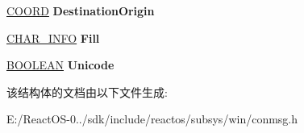 \begin{DoxyCompactItemize}
\mbox{\label{struct___c_o_n_s_o_l_e___s_c_r_o_l_l_s_c_r_e_e_n_b_u_f_f_e_r_a26761372980df00be8c9c395a2dad7ae}} 
\hyperlink{struct___c_o_o_r_d}{C\+O\+O\+RD} {\bfseries Destination\+Origin}
\item 
\mbox{\label{struct___c_o_n_s_o_l_e___s_c_r_o_l_l_s_c_r_e_e_n_b_u_f_f_e_r_a4a940ad8691d1e4b7f25b4a51e66d462}} 
\hyperlink{struct___c_h_a_r___i_n_f_o}{C\+H\+A\+R\+\_\+\+I\+N\+FO} {\bfseries Fill}
\item 
\mbox{\label{struct___c_o_n_s_o_l_e___s_c_r_o_l_l_s_c_r_e_e_n_b_u_f_f_e_r_ae5a74ba9167071107b64f6c1fc85609d}} 
\hyperlink{_processor_bind_8h_a112e3146cb38b6ee95e64d85842e380a}{B\+O\+O\+L\+E\+AN} {\bfseries Unicode}
\end{DoxyCompactItemize}


该结构体的文档由以下文件生成\+:\begin{DoxyCompactItemize}
\item 
E\+:/\+React\+O\+S-\/0../sdk/include/reactos/subsys/win/conmsg.\+h\end{DoxyCompactItemize}
